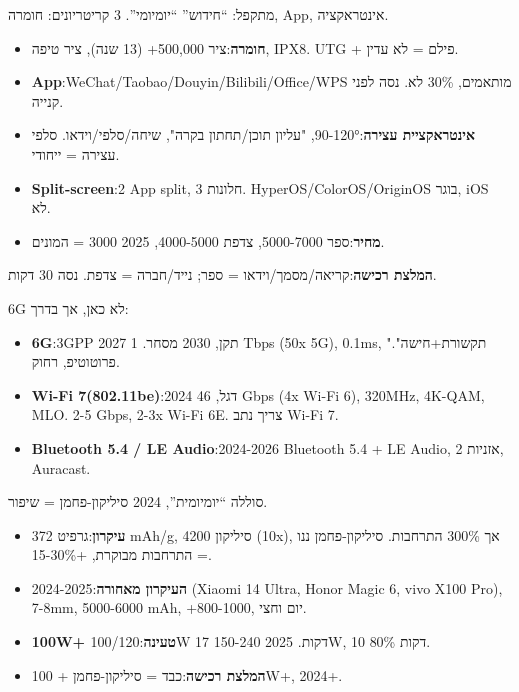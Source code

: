 
מתקפל: “חידוש” “יומיומי”. 3 קריטריונים: חומרה, App, אינטראקציה.

\begin{itemize}
  \item \textbf{חומרה}:ציר 500,000+ (13 שנה), ציר טיפה, IPX8. UTG + פילם = לא עדין.
  \item \textbf{App}:WeChat/Taobao/Douyin/Bilibili/Office/WPS מותאמים, 30\% לא. נסה לפני קנייה.
  \item \textbf{אינטראקציית עצירה}:90-120°, "עליון תוכן/תחתון בקרה", שיחה/סלפי/וידאו. סלפי עצירה = ייחודי.
  \item \textbf{Split-screen}:2 App split, 3 חלונות. HyperOS/ColorOS/OriginOS בוגר, iOS לא.
  \item \textbf{מחיר}:ספר 5000-7000, צדפת 4000-5000, 2025 3000 = המונים.
\end{itemize}

\textbf{המלצת רכישה}:קריאה/מסמך/וידאו = ספר; נייד/חברה = צדפת. נסה 30 דקות.


6G לא כאן, אך בדרך:

\begin{itemize}
  \item \textbf{6G}:3GPP 2027 תקן, 2030 מסחר. 1 Tbps (50x 5G), 0.1ms, "תקשורת+חישה". פרוטוטיפ, רחוק.
  \item \textbf{Wi-Fi 7(802.11be)}:2024 דגל, 46 Gbps (4x Wi-Fi 6), 320MHz, 4K-QAM, MLO. 2-5 Gbps, 2-3x Wi-Fi 6E. צריך נתב Wi-Fi 7.
  \item \textbf{Bluetooth 5.4 / LE Audio}:2024-2026 Bluetooth 5.4 + LE Audio, 2 אזניות, Auracast.
\end{itemize}


סוללה “יומיומית”, 2024 סיליקון-פחמן = שיפור.

\begin{itemize}
  \item \textbf{עיקרון}:גרפיט 372 mAh/g, סיליקון 4200 (10x), אך 300\% התרחבות. סיליקון-פחמן ננו = התרחבות מבוקרת, +15-30\%.
  \item \textbf{העיקרון מאחורה}:2024-2025 (Xiaomi 14 Ultra, Honor Magic 6, vivo X100 Pro), 7-8mm, 5000-6000 mAh, +800-1000, יום וחצי.
  \item \textbf{100W+ טעינה}:100/120W 17 דקות. 2025 150-240W, 10 דקות 80\%.
  \item \textbf{המלצת רכישה}:כבד = סיליקון-פחמן + 100W+, 2024+.
\end{itemize}

